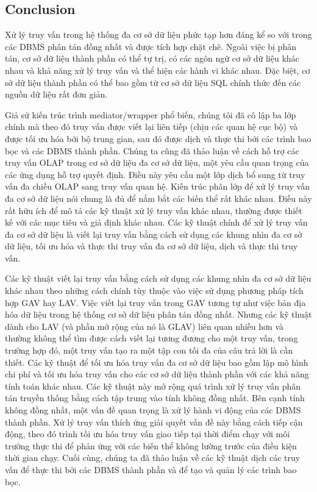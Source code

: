 \documentclass[a4paper]{article}
\begin{document}
\subsection{Conclusion}\label{subsec:conclusion}
Xử lý truy vấn trong hệ thống đa cơ sở dữ liệu phức tạp hơn đáng kể so với trong các DBMS phân tán đồng nhất và được tích hợp chặt chẽ. Ngoài việc bị phân tán, cơ sở dữ liệu thành phần có thể tự trị, có các ngôn ngữ cơ sở dữ liệu khác nhau và khả năng xử lý truy vấn và thể hiện các hành vi khác nhau. Đặc biệt, cơ sở dữ liệu thành phần có thể bao gồm từ cơ sở dữ liệu SQL chính thức đến các nguồn dữ liệu rất đơn giản.


Giả sử kiến trúc trình mediator/wrapper phổ biến, chúng tôi đã cô lập ba lớp chính mà theo đó truy vấn được viết lại liên tiếp (chịu các quan hệ cục bộ) và được tối ưu hóa bởi bộ trung gian, sau đó được dịch và thực thi bởi các trình bao bọc và các DBMS thành phần. Chúng ta cũng đã thảo luận về cách hỗ trợ các truy vấn OLAP trong cơ sở dữ liệu đa cơ sở dữ liệu, một yêu cầu quan trọng của các ứng dụng hỗ trợ quyết định. Điều này yêu cầu một lớp dịch bổ sung từ truy vấn đa chiều OLAP sang truy vấn quan hệ. Kiến trúc phân lớp để xử lý truy vấn đa cơ sở dữ liệu nói chung là đủ để nắm bắt các biến thể rất khác nhau. Điều này rất hữu ích để mô tả các kỹ thuật xử lý truy vấn khác nhau, thường được thiết kế với các mục tiêu và giả định khác nhau. Các kỹ thuật chính để xử lý truy vấn đa cơ sở dữ liệu là viết lại truy vấn bằng cách sử dụng các khung nhìn đa cơ sở dữ liệu, tối ưu hóa và thực thi truy vấn đa cơ sở dữ liệu, dịch và thực thi truy vấn.


Các kỹ thuật viết lại truy vấn bằng cách sử dụng các khung nhìn đa cơ sở dữ liệu khác nhau theo những cách chính tùy thuộc vào việc sử dụng phương pháp tích hợp GAV hay LAV. Việc viết lại truy vấn trong GAV tương tự như việc bản địa hóa dữ liệu trong hệ thống cơ sở dữ liệu phân tán đồng nhất. Nhưng các kỹ thuật dành cho LAV (và phần mở rộng của nó là GLAV) liên quan nhiều hơn và thường không thể tìm được cách viết lại tương đương cho một truy vấn, trong trường hợp đó, một truy vấn tạo ra một tập con tối đa của câu trả lời là cần thiết. Các kỹ thuật để tối ưu hóa truy vấn đa cơ sở dữ liệu bao gồm lập mô hình chi phí và tối ưu hóa truy vấn cho các cơ sở dữ liệu thành phần với các khả năng tính toán khác nhau. Các kỹ thuật này mở rộng quá trình xử lý truy vấn phân tán truyền thống bằng cách tập trung vào tính không đồng nhất. Bên cạnh tính không đồng nhất, một vấn đề quan trọng là xử lý hành vi động của các DBMS thành phần. Xử lý truy vấn thích ứng giải quyết vấn đề này bằng cách tiếp cận động, theo đó trình tối ưu hóa truy vấn giao tiếp tại thời điểm chạy với môi trường thực thi để phản ứng với các biến thể không lường trước của điều kiện thời gian chạy. Cuối cùng, chúng ta đã thảo luận về các kỹ thuật dịch các truy vấn để thực thi bởi các DBMS thành phần và để tạo và quản lý các trình bao bọc.
\end{document}
